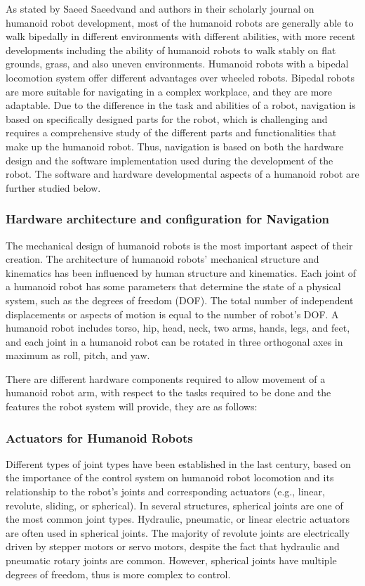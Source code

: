 \documentclass[conference]{IEEEtran}
\begin{document}
As stated by Saeed Saeedvand and authors in their scholarly journal on humanoid robot development, most of the humanoid robots are generally able to walk bipedally in different environments with different abilities, with more recent developments including the ability of humanoid robots to walk stably on flat grounds, grass, and also uneven environments\autocite{5saeedvand2019comprehensive}. Humanoid robots with a bipedal locomotion system offer different advantages over wheeled robots. Bipedal robots are more suitable for navigating in a complex workplace, and they are more adaptable\autocite{6silva2007historical}\autocite{6al2014modeling}. Due to the difference in the task and abilities of a robot, navigation is based on specifically designed parts for the robot, which is challenging and requires a comprehensive study of the different parts and functionalities that make up the humanoid robot. Thus, navigation is based on both the hardware design and the software implementation used during the development of the robot. The software and hardware developmental aspects of a humanoid robot are further studied below.

\subsubsection{Hardware architecture and configuration for Navigation}
The mechanical design of humanoid robots is the most important aspect of their creation. The architecture of humanoid robots' mechanical structure and kinematics has been influenced by human structure and kinematics.
Each joint of a humanoid robot has some parameters that determine the state of a physical system, such as the degrees of freedom (DOF). The total number of independent displacements or aspects of motion is equal to the number of robot’s DOF. A humanoid robot includes torso, hip, head, neck, two arms, hands, legs, and feet, and each joint in a humanoid robot can be rotated in three orthogonal axes in maximum as roll, pitch, and yaw\autocite{5saeedvand2019comprehensive}.

There are different hardware components required to allow movement of a humanoid robot arm, with respect to the tasks required to be done and the features the robot system will provide, they are as follows:

\subsubsection{Actuators for Humanoid Robots}
Different types of joint types have been established in the last century, based on the importance of the control system on humanoid robot locomotion and its relationship to the robot's joints and corresponding actuators (e.g., linear, revolute, sliding, or spherical). In several structures, spherical joints are one of the most common joint types. Hydraulic, pneumatic, or linear electric actuators are often used in spherical joints. The majority of revolute joints are electrically driven by stepper motors or servo motors, despite the fact that hydraulic and pneumatic rotary joints are common. However, spherical joints have multiple degrees of freedom, thus is more complex to control.
\end{document}
